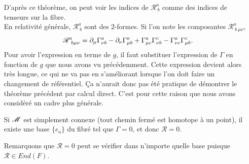 \documentclass[a4paper,11pt]{report}
\begin{document}
                D'après ce théorème, on peut voir les indices de $\mathscr{R}^a_{~b}$ comme des indices de tenseurs sur la fibre.\\
                
                En relativité générale, $\mathscr{R}^a_{~b}$ sont des $2$-formes. Si l'on note les composantes $\mathscr{R}^a_{~b~\mu\nu}$, 
                \begin{equation}
                    \mathscr{R}^a_{~b\mu\nu} = \partial_\mu\Gamma^a_{\nu b}-\partial_\nu\Gamma^a_{\mu b} + \Gamma^a_{\mu c}\Gamma^c_{\nu b}-\Gamma^a_{\nu c}\Gamma^c_{\mu b}.
                \end{equation}
                Pour avoir l'expression en terme de $g$, il faut substituer l'expression de $\Gamma$ en fonction de $g$ que nous avons vu précédemment. Cette expression devient alors très longue, ce qui ne va pas en s'améliorant lorsque l'on doit faire un changement de référentiel. Ça n'aurait donc pas été pratique de démontrer le théorème précédent par calcul direct. C'est pour cette raison que nous avons considéré un cadre plus générale.
                
                \begin{thm}\begin{leftbar}
                    Si $\mathscr{M}$ est simplement connexe (tout chemin fermé est homotope à un point), il existe une base $\{e_a\}$ du fibré tel que $\Gamma = 0$, et donc $\mathscr{R} = 0$.
                \end{leftbar}\end{thm}
                
                Remarquons que $\mathscr{R} = 0$ peut se vérifier dans n'importe quelle base puisque $\mathscr{R}\in End(F)$.
                
\end{document}
